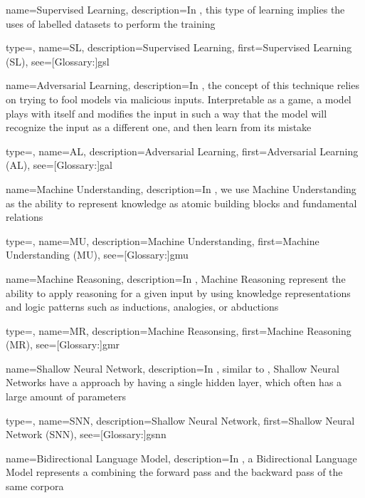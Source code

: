 {
  name={Supervised Learning},
  description={In , this type of learning implies the uses of labelled datasets to perform the training}
}

{
  type=\acronymtype,
  name={SL},
  description={Supervised Learning},
  first={Supervised Learning (SL)},
  see=[Glossary:]{gsl}
}

{
  name={Adversarial Learning},
  description={In , the concept of this technique relies on trying to fool models via malicious inputs. Interpretable as a game, a model plays with itself and modifies the input in such a way that the model will recognize the input as a different one, and then learn from its mistake}
}

{
  type=\acronymtype,
  name={AL},
  description={Adversarial Learning},
  first={Adversarial Learning (AL)},
  see=[Glossary:]{gal}
}

{
  name={Machine Understanding},
  description={In , we use Machine Understanding as the ability to represent knowledge as atomic building blocks and fundamental relations}
}

{
  type=\acronymtype,
  name={MU},
  description={Machine Understanding},
  first={Machine Understanding (MU)},
  see=[Glossary:]{gmu}
}

{
  name={Machine Reasoning},
  description={In , Machine Reasoning represent the ability to apply reasoning for a given input by using knowledge representations and logic patterns such as inductions, analogies, or abductions}
}

{
  type=\acronymtype,
  name={MR},
  description={Machine Reasonsing},
  first={Machine Reasoning (MR)},
  see=[Glossary:]{gmr}
}


{
  name={Shallow Neural Network},
  description={In , similar to , Shallow Neural Networks have a  approach by having a single hidden layer, which often has a large amount of parameters}
}

{
  type=\acronymtype,
  name={SNN},
  description={Shallow Neural Network},
  first={Shallow Neural Network (SNN)},
  see=[Glossary:]{gsnn}
}


{
  name={Bidirectional Language Model},
  description={In , a Bidirectional Language Model represents a  combining the forward pass and the backward pass of the same corpora}
}

